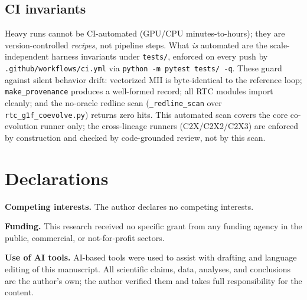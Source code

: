\documentclass[12pt,letterpaper]{article}
\begin{document}
\subsection*{CI invariants}

Heavy runs cannot be CI-automated (GPU/CPU minutes-to-hours); they are version-controlled
\emph{recipes}, not pipeline steps. What \emph{is} automated are the scale-independent
harness invariants under \texttt{tests/}, enforced on every push by
\texttt{.github/workflows/ci.yml} via \texttt{python -m pytest tests/ -q}. These guard
against silent behavior drift: vectorized MII is byte-identical to the reference loop;
\texttt{make\_provenance} produces a well-formed record; all RTC modules import cleanly; and
the no-oracle redline scan (\texttt{\_redline\_scan} over
\texttt{rtc\_g1f\_coevolve.py}) returns zero hits. This automated scan covers the core
co-evolution runner only; the cross-lineage runners (C2X/C2X2/C2X3) are enforced by
construction and checked by code-grounded review, not by this scan.

\FloatBarrier

\footnotesize
\section*{Declarations}

\textbf{Competing interests.} The author declares no competing interests.

\textbf{Funding.} This research received no specific grant from any funding agency in the public, commercial, or not-for-profit sectors.

\textbf{Use of AI tools.} AI-based tools were used to assist with drafting and language editing of this manuscript. All scientific claims, data, analyses, and conclusions are the author's own; the author verified them and takes full responsibility for the content.
\end{document}
